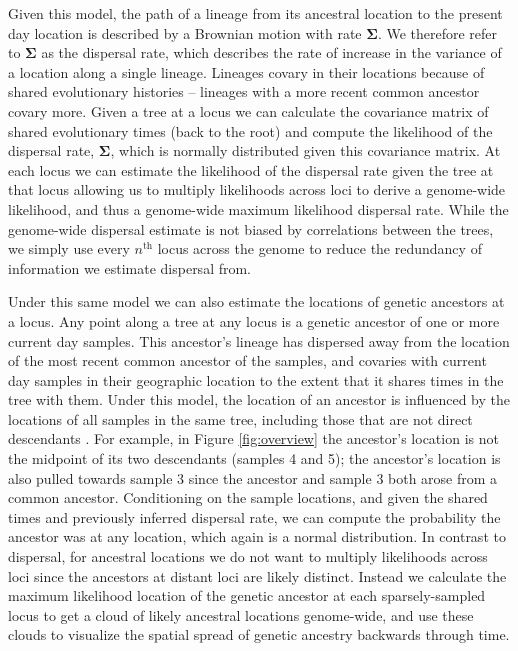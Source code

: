 \documentclass[12pt]{article}
\begin{document}
Given this model, the path of a lineage from its ancestral location to the present day location is described by a Brownian motion with rate $\mathbf{\Sigma}$. We therefore refer to $\mathbf{\Sigma}$ as the dispersal rate, which describes the rate of increase in the variance of a location along a single lineage. Lineages covary in their locations because of shared evolutionary histories -- lineages with a more recent common ancestor covary more. Given a tree at a locus we can calculate the covariance matrix of shared evolutionary times (back to the root) and compute the likelihood of the dispersal rate, $\mathbf{\Sigma}$, which is normally distributed given this covariance matrix. At each locus we can estimate the likelihood of the dispersal rate given the tree at that locus allowing us to multiply likelihoods across loci to derive a genome-wide likelihood, and thus a genome-wide maximum likelihood dispersal rate. While the genome-wide dispersal estimate is not biased by correlations between the trees, we simply use every $n^{\mathrm{th}}$ locus across the genome to reduce the redundancy of information we estimate dispersal from.

Under this same model we can also estimate the locations of genetic ancestors at a locus. Any point along a tree at any locus is a genetic ancestor of one or more current day samples. This ancestor's lineage has dispersed away from the location of the most recent common ancestor of the samples, and covaries with current day samples in their geographic location to the extent that it shares times in the tree with them. Under this model, the location of an ancestor is influenced by the locations of all samples in the same tree, including those that are not direct descendants \citep[cf.][]{wohns2021unified}. For example, in Figure \ref{fig:overview} the ancestor's location is not the midpoint of its two descendants (samples 4 and 5); the ancestor's location is also pulled towards sample 3 since the ancestor and sample 3 both arose from a common ancestor. Conditioning on the sample locations, and given the shared times and previously inferred dispersal rate, we can compute the probability the ancestor was at any location, which again is a normal distribution. In contrast to dispersal, for ancestral locations we do not want to multiply likelihoods across loci since the ancestors at distant loci are likely distinct. Instead we calculate the maximum likelihood location of the genetic ancestor at each sparsely-sampled locus to get a cloud of likely ancestral locations genome-wide, and use these clouds to visualize the spatial spread of genetic ancestry backwards through time.
\end{document}
